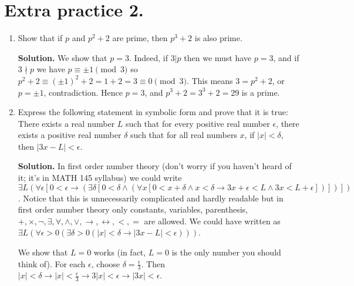 \documentclass[11pt]{article}
\begin{document}
\section {Extra practice 2.}
\begin{enumerate}
\item Show that if $p$ and $p^2+2$ are prime, then $p^3+2$ is also prime.

\textbf {Solution.} We show that $p=3$. Indeed, if $3|p$ then we must have $p=3$, and if $3\nmid p$ we have $p\equiv \pm 1\pmod{3}$ so $p^2+2\equiv (\pm 1)^2+2=1+2=3\equiv 0\pmod {3}$. This means $3=p^2+2$, or $p=\pm 1$, contradiction. Hence $p=3$, and $p^3+2=3^3+2=29$ is a prime.

\item Express the following statement in symbolic form and prove that it is true:\\
There exists a real number $L$ such that for every positive real number $\epsilon$, there exists a positive real number $\delta$ such that for all real numbers $x$, if $|x|<\delta$, then $|3x-L|<\epsilon$.

\textbf {Solution.} In first order number theory (don't worry if you haven't heard of it; it's in MATH 145 syllabus) we could write $\exists L(\forall\epsilon [0<\epsilon \to(\exists\delta [0<\delta\land (\forall x [0<x+\delta \land x<\delta\to 3x+\epsilon<L\land 3x<L+\epsilon ])])])$. Notice that this is unnecessarily complicated and hardly readable but in first order number theory only constants, variables, parenthesis, $+, \times, \neg, \exists, \forall, \land, \lor, \to, \leftrightarrow, <, =$ are allowed. We could have written as $\exists L(\forall \epsilon>0(\exists\delta>0 (|x|<\delta \to |3x-L|<\epsilon)))$.

We show that $L=0$ works (in fact, $L=0$ is the only number you should think of). For each $\epsilon$, choose $\delta=\frac{\epsilon}{3}$. Then $|x|<\delta\to |x|<\frac{\epsilon}{3}\to 3|x|<\epsilon \to |3x|<\epsilon$.

\end{enumerate}
\end{document}
